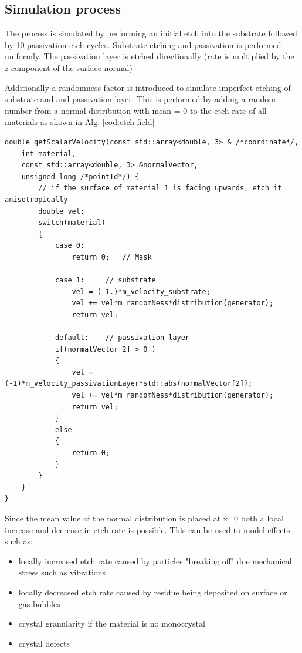 \subsection{Simulation process}
The process is simulated by performing an initial etch into the substrate followed by 
10 passivation-etch cycles. Substrate etching and passivation is performed uniformly. 
The passivation layer is etched directionally (rate is multiplied by the z-component of the surface normal)

Additionally a randomness factor is introduced to simulate imperfect etching of substrate and and passivation layer.
This is performed by adding a random number from a normal distribution with mean = 0 to the etch rate of all materials as shown in Alg. \ref{cod:etch-field}

\begin{minipage}{\linewidth}
\begin{lstlisting}[caption=etch velocity field, label=cod:etch-field]
double getScalarVelocity(const std::array<double, 3> & /*coordinate*/,
    int material,
    const std::array<double, 3> &normalVector,
    unsigned long /*pointId*/) {
        // if the surface of material 1 is facing upwards, etch it anisotropically
        double vel;
        switch(material)
        {
            case 0:     
                return 0;   // Mask

            case 1:     // substrate
                vel = (-1.)*m_velocity_substrate;
                vel += vel*m_randomNess*distribution(generator);
                return vel;

            default:    // passivation layer
            if(normalVector[2] > 0 )
            {
                vel = (-1)*m_velocity_passivationLayer*std::abs(normalVector[2]);
                vel += vel*m_randomNess*distribution(generator);
                return vel;
            }
            else
            {
                return 0;
            }
        }
    }        
}

\end{lstlisting}
\end{minipage}


Since the mean value of the normal distribution is placed at x=0 both a local increase and decrease in etch rate is possible.
This can be used to model effects such as:
\begin{itemize}
    \item locally increased etch rate caused by particles "breaking off" due mechanical stress such as vibrations
    \item locally decreased etch rate caused by residue being deposited on surface or gas bubbles
    \item crystal granularity if the material is no monocrystal
    \item crystal defects
\end{itemize}


